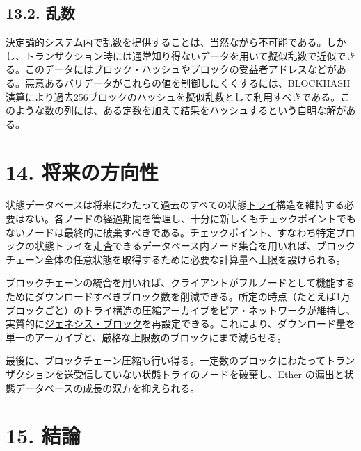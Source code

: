 \documentclass[
]{ltjsarticle}
\begin{document}
\hypertarget{ux4e71ux6570}{%
\subsection{13.2. 乱数}\label{ux4e71ux6570}}

決定論的システム内で乱数を提供することは、当然ながら不可能である。しかし、トランザクション時には通常知り得ないデータを用いて擬似乱数で近似できる。このデータにはブロック・ハッシュやブロックの受益者アドレスなどがある。悪意あるバリデータがこれらの値を制御しにくくするには、\protect\hyperlink{blockhash}{BLOCKHASH}
演算により過去256ブロックのハッシュを擬似乱数として利用すべきである。このような数の列には、ある定数を加えて結果をハッシュするという自明な解がある。

\protect\hypertarget{ch:future}{}{}

\hypertarget{ux5c06ux6765ux306eux65b9ux5411ux6027}{%
\section{14. 将来の方向性}\label{ux5c06ux6765ux306eux65b9ux5411ux6027}}

状態データベースは将来にわたって過去のすべての状態\protect\hyperlink{trie}{トライ}構造を維持する必要はない。各ノードの経過期間を管理し、十分に新しくもチェックポイントでもないノードは最終的に破棄すべきである。チェックポイント、すなわち特定ブロックの状態トライを走査できるデータベース内ノード集合を用いれば、ブロックチェーン全体の任意状態を取得するために必要な計算量へ上限を設けられる。

ブロックチェーンの統合を用いれば、クライアントがフルノードとして機能するためにダウンロードすべきブロック数を削減できる。所定の時点（たとえば1万ブロックごと）のトライ構造の圧縮アーカイブをピア・ネットワークが維持し、実質的に\protect\hyperlink{Genesis_Block}{ジェネシス・ブロック}を再設定できる。これにより、ダウンロード量を単一のアーカイブと、厳格な上限数のブロックにまで減らせる。

最後に、ブロックチェーン圧縮も行い得る。一定数のブロックにわたってトランザクションを送受信していない状態トライのノードを破棄し、Ether
の漏出と状態データベースの成長の双方を抑えられる。

\protect\hypertarget{ch:conclusion}{}{}

\hypertarget{ux7d50ux8ad6}{%
\section{15. 結論}\label{ux7d50ux8ad6}}
\end{document}
